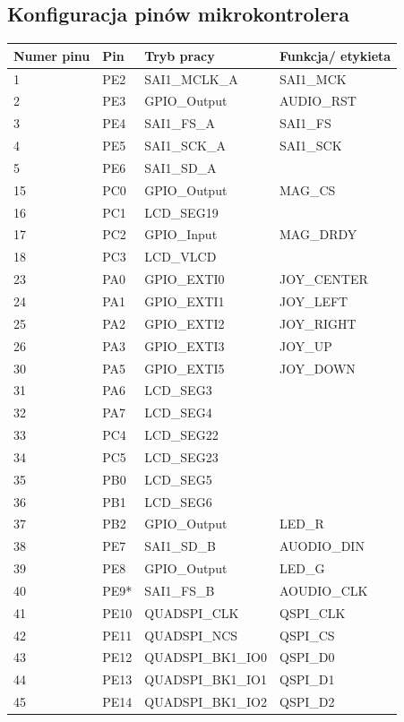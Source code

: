 \documentclass[10pt, a4paper]{article}
\begin{document}
\subsection{Konfiguracja pinów mikrokontrolera}
\begin{table}[H]
\centering
\begin{tabular}{|l|l|l|l|}
\hline
Numer pinu & Pin & Tryb pracy & Funkcja/ etykieta \\ \hline
1&		PE2&		SAI1\_MCLK\_A	&	SAI1\_MCK	\\
2&		PE3	&	GPIO\_Output		&	AUDIO\_RST\\
3&		PE4	&	SAI1\_FS\_A			&	SAI1\_FS\\
4&		PE5	&	SAI1\_SCK\_A		&	SAI1\_SCK\\
5&		PE6	&	SAI1\_SD\_A	& \\
15&		PC0	&	GPIO\_Output		&	MAG\_CS\\
16&		PC1	&	LCD\_SEG19	& \\
17&		PC2	&	GPIO\_Input	&		MAG\_DRDY\\
18	&	PC3	&	LCD\_VLCD	& \\
23&		PA0	&	GPIO\_EXTI0	&		JOY\_CENTER\\
24	&	PA1	&	GPIO\_EXTI1	&		JOY\_LEFT\\
25&		PA2	&	GPIO\_EXTI2	&		JOY\_RIGHT\\
26	&	PA3	&	GPIO\_EXTI3	&		JOY\_UP\\
30&		PA5	&	GPIO\_EXTI5	&		JOY\_DOWN\\
31	&	PA6	&	LCD\_SEG3	&	\\
32	&	PA7	&	LCD\_SEG4	&	\\
33	&	PC4	&	LCD\_SEG22	&	\\
34	&	PC5	&	LCD\_SEG23	&	\\
35	&	PB0	&	LCD\_SEG5	&	\\
36	&	PB1	&	LCD\_SEG6	&	\\
37	&	PB2	&	GPIO\_Output	&		LED\_R\\
38	&	PE7	&	SAI1\_SD\_B	&		AUODIO\_DIN\\
39	&	PE8	&	GPIO\_Output	&		LED\_G\\
40	&	PE9*&	SAI1\_FS\_B	&		AOUDIO\_CLK\\
41	&	PE10&	QUADSPI\_CLK	&		QSPI\_CLK\\
42	&	PE11&	QUADSPI\_NCS	&		QSPI\_CS\\
43	&	PE12&	QUADSPI\_BK1\_IO0&		QSPI\_D0\\
44	&	PE13&	QUADSPI\_BK1\_IO1	&	QSPI\_D1\\
45	&	PE14&	QUADSPI\_BK1\_IO2	&	QSPI\_D2\\

\end{tabular}
\end{table}
\end{document}
